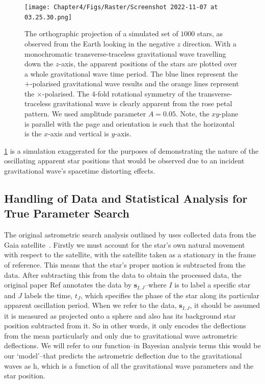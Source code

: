 \begin{figure} 
\centering    
\texttt{[image: Chapter4/Figs/Raster/Screenshot 2022-11-07 at 03.25.30.png]}
\caption{\label{fig:epsart1} The orthographic projection of a simulated set of $1000$ stars, as observed from the Earth looking in the negative $z$ direction. With a monochromatic transverse-traceless gravitational wave travelling down the $z$-axis, the apparent positions of the stars are plotted over a whole gravitational wave time period. The blue lines represent the $+$-polarised gravitational wave results and the orange lines represent the $\times$-polarised. The 4-fold rotational symmetry of the transverse-traceless gravitational wave is clearly apparent from the rose petal pattern. We used amplitude parameter $A=0.05$. Note, the $xy$-plane is parallel with the page and orientation is such that the horizontal is the $x$-axis and vertical is $y$-axis.}
\end{figure}


\cref{fig:epsart1} is a simulation exaggerated for the purposes of demonstrating the nature of the oscillating apparent star positions that would be observed due to an incident gravitational wave's spacetime distorting effects.


\subsection{Handling of Data and Statistical Analysis for True Parameter Search}\label{sec:data_handling}

The original astrometric search analysis outlined by \cite{Mihaylov_2020} uses collected data from the Gaia satellite~\cite{2016}. Firstly we must account for the star's own natural movement with respect to the satellite, with the satellite taken as a stationary in the frame of reference. This means that the star's proper motion is subtracted from the data. After subtracting this from the data to obtain the processed data, the original paper Ref \cite{Mihaylov_2020} annotates the data by $\textbf{s}_{I,J}$--where $I$ is to label a specific star and $J$ labels the time, $t_J$, which specifies the phase of the star along its particular apparent oscillation period. When we refer to the data, $\textbf{s}_{I,J}$, it should be assumed it is measured as projected onto a sphere and also has its background star position subtracted from it. So in other words, it only encodes the deflections from the mean particularly and only due to gravitational wave astrometric deflections. We will refer to our function--in Bayesian analysis terms this would be our `model'--that predicts the astrometric deflection due to the gravitational waves as  $\mathbf{ \mathrm{h} }$, which is a function of all the gravitational wave parameters and the star position.


